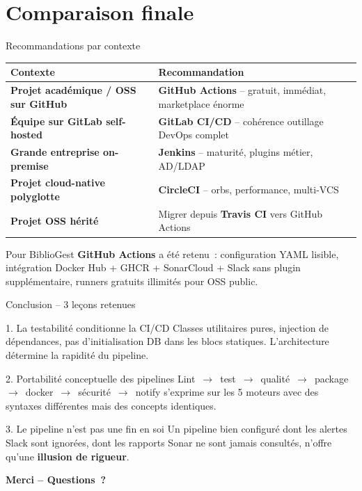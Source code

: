 \documentclass[aspectratio=169,12pt]{beamer}
\begin{document}
\section{Comparaison finale}

\begin{frame}{Recommandations par contexte}
  \centering
  \footnotesize
  \renewcommand{\arraystretch}{1.5}
  \begin{tabular}{>{\bfseries}p{4.5cm} p{8cm}}
    \toprule
    Contexte & Recommandation \\
    \midrule
    Projet académique / OSS sur GitHub & \textbf{GitHub Actions} -- gratuit, immédiat, marketplace énorme \\
    Équipe sur GitLab self-hosted     & \textbf{GitLab CI/CD} -- cohérence outillage DevOps complet \\
    Grande entreprise on-premise      & \textbf{Jenkins} -- maturité, plugins métier, AD/LDAP \\
    Projet cloud-native polyglotte    & \textbf{CircleCI} -- orbs, performance, multi-VCS \\
    Projet OSS hérité                 & Migrer depuis \textbf{Travis CI} vers GitHub Actions \\
    \bottomrule
  \end{tabular}

  \vspace{0.8em}
  \begin{block}{Pour BiblioGest}
    \textbf{GitHub Actions} a été retenu~: configuration YAML lisible,
    intégration Docker Hub + GHCR + SonarCloud + Slack sans plugin
    supplémentaire, runners gratuits illimités pour OSS public.
  \end{block}
\end{frame}

\begin{frame}{Conclusion -- 3 leçons retenues}
  \begin{block}{1. La testabilité conditionne la CI/CD}
    Classes utilitaires pures, injection de dépendances, pas d'initialisation
    DB dans les blocs statiques. L'architecture détermine la rapidité du
    pipeline.
  \end{block}

  \begin{block}{2. Portabilité conceptuelle des pipelines}
    Lint~$\to$~test~$\to$~qualité~$\to$~package~$\to$~docker~$\to$~sécurité~$\to$~notify
    s'exprime sur les 5 moteurs avec des syntaxes différentes mais des
    concepts identiques.
  \end{block}

  \begin{alertblock}{3. Le pipeline n'est pas une fin en soi}
    Un pipeline bien configuré dont les alertes Slack sont ignorées, dont les
    rapports Sonar ne sont jamais consultés, n'offre qu'une \textbf{illusion
    de rigueur}.
  \end{alertblock}

  \vspace{0.5em}
  \centering
  \large\textbf{Merci -- Questions~?}
\end{frame}
\end{document}

